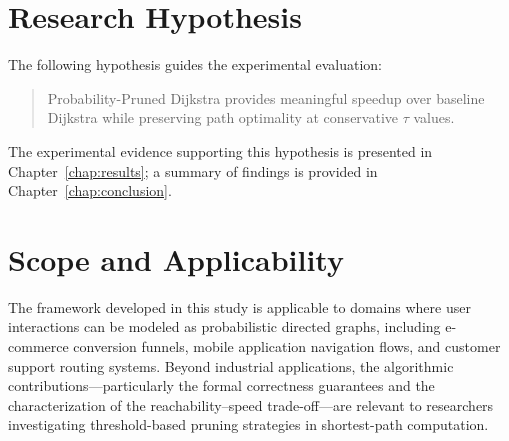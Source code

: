 \section{Research Hypothesis}

The following hypothesis guides the experimental evaluation:

\begin{quote}
Probability-Pruned Dijkstra provides meaningful speedup over baseline Dijkstra while preserving path optimality at conservative $\tau$ values.
\end{quote}

\noindent The experimental evidence supporting this hypothesis is presented in Chapter~\ref{chap:results}; a summary of findings is provided in Chapter~\ref{chap:conclusion}.

\section{Scope and Applicability}

The framework developed in this study is applicable to domains where user interactions can be modeled as probabilistic directed graphs, including e-commerce conversion funnels, mobile application navigation flows, and customer support routing systems. Beyond industrial applications, the algorithmic contributions---particularly the formal correctness guarantees and the characterization of the reachability--speed trade-off---are relevant to researchers investigating threshold-based pruning strategies in shortest-path computation.
